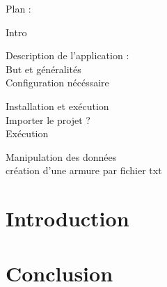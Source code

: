 \documentclass[a4paper]{report}
\begin{document}



\tableofcontents


Plan : 

	Intro

	Description de l'application :\\
		But et généralités\\
		Configuration nécéssaire
		
	Installation et exécution\\
		Importer le projet ?\\
		Exécution

	Manipulation des données\\
		création d'une armure par fichier txt




\chapter*{Introduction}
%


\chapter*{Conclusion}
%
\end{document}
